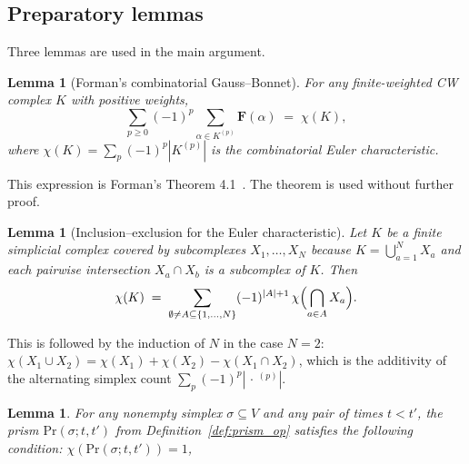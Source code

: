 \documentclass[
    pre,
    twocolumn,
    superscriptaddress,
    showpacs,
    nofootinbib,
    amsmath,
    amssymb,
    floatfix
]{revtex4-2}
\newcommand{\F}{\mathbf{F}}        %
\theoremstyle{plain} %
\newtheorem{lemma}[theorem]{\indent Lemma}
\theoremstyle{definition} %
\begin{document}
\subsection{Preparatory lemmas}\label{app:prep}

Three lemmas are used in the main argument.

\begin{lemma}[Forman's combinatorial Gauss--Bonnet]\label{lem:forman_GB}
For any finite-weighted CW complex $K$ with positive weights,
\begin{equation*}\label{eq:forman_GB}
    \sum_{p \ge 0} (-1)^p \!\sum_{\alpha \in K^{(p)}} \F(\alpha)
    \;=\; \chi(K),
\end{equation*}
where $\chi(K) = \sum_p (-1)^p |K^{(p)}|$ is the combinatorial Euler
characteristic.
\end{lemma}
This expression is Forman's Theorem 4.1~\cite{Forman2003}. The theorem is used without further proof.

\begin{lemma}[Inclusion--exclusion for the Euler characteristic]
\label{lem:incl_excl}
Let $K$ be a finite simplicial complex covered by subcomplexes
$X_1, \ldots, X_N$ because $K = \bigcup_{a=1}^N X_a$ and
each pairwise intersection $X_a \cap X_b$ is a subcomplex of $K$.
Then
\begin{equation*}\label{eq:incl_excl}
    \chi(K)
    \;=\;
    \sum_{\emptyset \neq A \subseteq \{1,\ldots,N\}}
        (-1)^{|A|+1}\,
        \chi\Bigl(\bigcap_{a \in A} X_a\Bigr).
\end{equation*}
\end{lemma}
This is followed by the induction of $N$ in the case $N = 2$:
$\chi(X_1 \cup X_2) = \chi(X_1) + \chi(X_2) - \chi(X_1 \cap X_2)$,
which is the additivity of the alternating simplex count
$\sum_p (-1)^p |\,\cdot\,^{(p)}|$.

\begin{lemma}\label{lem:prism_euler}
For any nonempty simplex $\sigma \subseteq V$ and any pair of times
$t < t'$, the prism $\mathrm{Pr}(\sigma; t, t')$ from
Definition~\ref{def:prism_op} satisfies the following condition:
$\chi(\mathrm{Pr}(\sigma; t, t')) = 1$,
\end{lemma}
\end{document}
